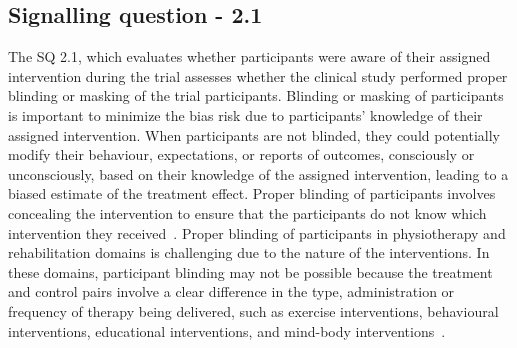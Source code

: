 \documentclass[sn-mathphys,Numbered]{sn-jnl}%
\begin{document}
\subsection*{Signalling question - 2.1}
\label{subsec:2_1}
%
The SQ 2.1, which evaluates whether participants were aware of their assigned intervention during the trial assesses whether the clinical study performed proper blinding or masking of the trial participants.
Blinding or masking of participants is important to minimize the bias risk due to participants' knowledge of their assigned intervention.
When participants are not blinded, they could potentially modify their behaviour, expectations, or reports of outcomes, consciously or unconsciously, based on their knowledge of the assigned intervention, leading to a biased estimate of the treatment effect.
Proper blinding of participants involves concealing the intervention to ensure that the participants do not know which intervention they received~\cite{cedenilla2023psychosocial,swan2003bupropion,o2012rethinking}.
Proper blinding of participants in physiotherapy and rehabilitation domains is challenging due to the nature of the interventions. 
In these domains, participant blinding may not be possible because the treatment and control pairs involve a clear difference in the type, administration or frequency of therapy being delivered, such as exercise interventions, behavioural interventions, educational interventions, and mind-body interventions~\cite{andersson2020effect,buttery2023lung}.
\end{document}
